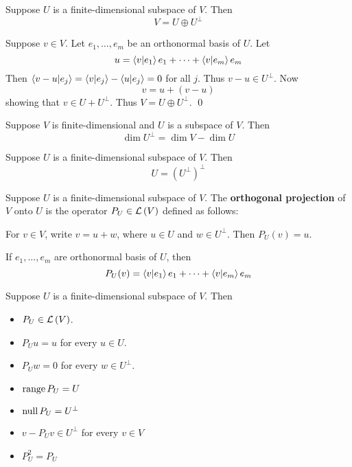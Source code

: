 \begin{theorem} 
    Suppose $U$ is a finite-dimensional subspace of $V$. Then
    \[ V = U \oplus U^\perp \]

    \begin{proof*}
        Suppose $v \in V$. Let $e_1, \dots, e_m$ be an orthonormal basis of $U$. Let
        \[ u = \innerproduct{v}{e_1}e_1 + \dots + \innerproduct{v}{e_m}e_m \]
        Then $\innerproduct{v - u}{e_j} = \innerproduct{v}{e_j} - \innerproduct{u}{e_j} = 0$ for all $j$. Thus $v - u \in U^\perp$.
        Now
        \[ v = u + (v - u) \]
        showing that $v \in U + U^\perp$. Thus $V = U \oplus U^\perp$. \qed
    \end{proof*}
\end{theorem}

\begin{theorem} 
    Suppose $V$ is finite-dimensional and $U$ is a subspace of $V$. Then
    \[ \dim U^\perp = \dim V - \dim U \]
\end{theorem}

\begin{theorem}
    Suppose $U$ is a finite-dimensional subspace of $V$. Then
    \[ U = (U^\perp)^\perp \]
\end{theorem}

\begin{definition}
    Suppose $U$ is a finite-dimensional subspace of $V$. The \textbf{orthogonal projection} of $V$ onto $U$
    is the operator $P_U \in \mathcal{L} \left( V \right)$ defined as follows:

    For $v \in V$, write $v = u + w$, where $u \in U$ and $w \in U^\perp$. Then $P_U(v) = u$.

    If $e_1, \dots, e_m$ are orthonormal basis of $U$, then
    \[ P_U(v) = \innerproduct{v}{e_1}e_1 + \dots + \innerproduct{v}{e_m}e_m \]
\end{definition}

\begin{theorem}
    Suppose $U$ is a finite-dimensional subspace of $V$. Then
    \begin{itemize}
        \item $P_U \in \mathcal{L} \left( V \right)$.
        \item $P_U u = u$ for every $u \in U$.
        \item $P_U w = 0$ for every $w \in U^\perp$.
        \item $\operatorname{range} P_U = U$
        \item $\operatorname{null} P_U = U^\perp$
        \item $v - P_Uv \in U^\perp$ for every $v \in V$
        \item $P_U^2 = P_U$
    \end{itemize}
\end{theorem}

